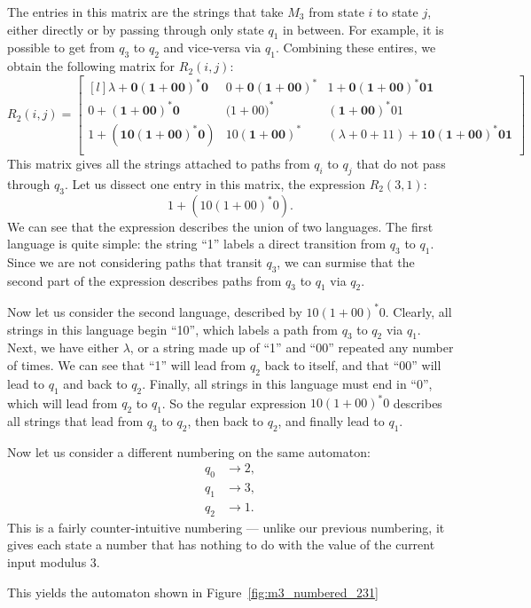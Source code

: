 \documentclass{bcthesis}
\renewcommand{\meo}[1]{}
\begin{document}
		The entries in this matrix are the strings that take $M_3$ from state $i$ to state $j$, either directly or by passing through only state $q_1$ in between.
		For example, it is possible to get from $q_3$ to $q_2$ and vice-versa via $q_1$.
		Combining these entires, we obtain the following matrix for $R_2(i, j)$:
		\[
			R_2 (i, j) = 
			\begin{bmatrix*}[l]
				\lambda + \bm{0(1+00)^*0} 	& 0+\bm{0(1+00)^*}		& 1+\bm{0(1+00)^*01}		\\
				0+\bm{(1+00)^*0} 			& \bm{(}1+00\bm{)^{*}} 	& \bm{(1+00)^*}01			\\
				1+\bm{(10(1+00)^*0)} 		& 10\bm{(1+00)^*} 		& (\lambda+0+11)+\bm{10(1+00)^*01} 	\\
			\end{bmatrix*}
		\]
		This matrix gives all the strings attached to paths from $q_i$ to $q_j$ that do not pass through $q_3$.
		Let us dissect one entry in this matrix, the expression $R_2(3, 1)$:
		\[
			1+(10(1+00)^*0).
		\]
		We can see that the expression describes the union of two languages.
		The first language is quite simple: the string ``1'' labels a direct transition from $q_3$ to $q_1$.
		Since we are not considering paths that transit $q_3$, we can surmise that the second part of the expression describes paths from $q_3$ to $q_1$ via $q_2$.

		Now let us consider the second language, described by $10 (1+00)^* 0$.
		Clearly, all strings in this language begin ``10'', which labels a path from $q_3$ to $q_2$ via $q_1$.
		Next, we have either $\lambda$, or a string made up of ``1'' and ``00'' repeated any number of times.
		We can see that ``1'' will lead from $q_2$ back to itself, and that ``00'' will lead to $q_1$ and back to $q_2$.
		Finally, all strings in this language must end in ``0'', which will lead from $q_2$ to $q_1$.
		So the regular expression $10 (1+00)^* 0$ describes all strings that lead from $q_3$ to $q_2$, then back to $q_2$, and finally lead to $q_1$.

		Now let us consider a different numbering on the same automaton:
		\begin{align*}
			q_0 &\to 2, \\
			q_1 &\to 3, \\
			q_2 &\to 1.
		\end{align*}
		This is a fairly counter-intuitive numbering --- unlike our previous numbering, it gives each state a number that has nothing to do with the value of the current input modulus 3.
		\meo{The careful reader might already be able to tell why this numbering will produce interesting results.}
		This yields the automaton shown in Figure~\ref{fig:m3_numbered_231}
\end{document}
